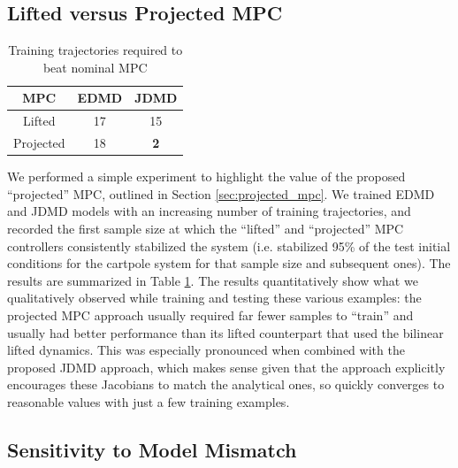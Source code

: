 \documentclass{article}
\begin{document}
\subsection{Lifted versus Projected MPC}
\begin{table}
  \vspace{-3.5\baselineskip}
  \begin{tabular}{ccc}\\
    \toprule  
    MPC       & {\color{orange} \textbf{EDMD}} & {\textbf{\color{cyan} JDMD}} \\
    \midrule
    Lifted    & 17   &          15 \\
    Projected & 18   &  \textbf{2} \\
    \bottomrule
  \end{tabular}
  \caption{Training trajectories required to beat nominal MPC}
  \vspace{-1\baselineskip}
  \label{tab:mpc_comp}
\end{table} 

We performed a simple experiment to highlight the value of the proposed ``projected'' MPC,
outlined in Section \ref{sec:projected_mpc}. We trained EDMD and JDMD models with an
increasing number of training trajectories, and recorded the first sample size at which the
``lifted'' and ``projected'' MPC controllers consistently stabilized the system (i.e.
stabilized 95\% of the test initial conditions for the cartpole system for that sample size
and subsequent ones).  The results are summarized in Table \ref{tab:mpc_comp}. The results
quantitatively show what we qualitatively observed while training and testing these various
examples: the projected MPC approach usually required far fewer samples to ``train'' and
usually had better performance than its lifted counterpart that used the bilinear
lifted dynamics. This was especially pronounced when combined with the proposed JDMD
approach, which makes sense given that the approach explicitly encourages these Jacobians to
match the analytical ones, so quickly converges to reasonable values with just a few training
examples.

\subsection{Sensitivity to Model Mismatch}
\end{document}
